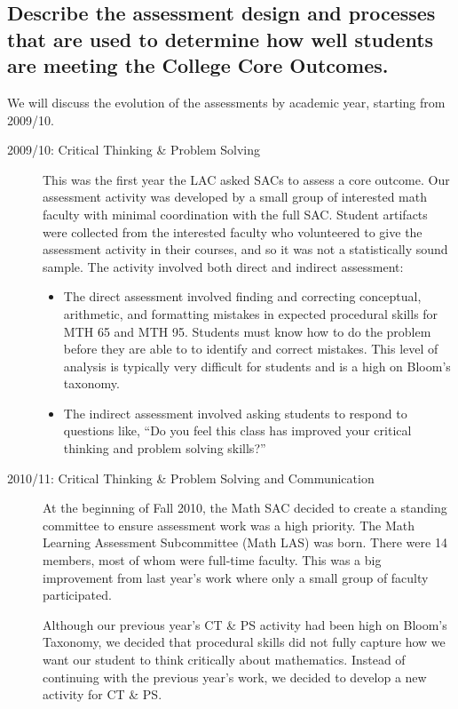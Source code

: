 \subsection[Core outcome assessment design and process]{Describe the assessment design and processes that are used to
determine how well students are meeting the College Core Outcomes.}
We will discuss the evolution of the assessments by academic year, starting
from 2009/10.
\begin{description}
	\item [2009/10: Critical Thinking  \& Problem Solving]

	This was the first year the LAC asked SACs to assess a core outcome. Our
	assessment activity was developed by a small group of interested math faculty
	with minimal coordination with the full SAC. Student artifacts were collected
	from the interested faculty who volunteered to give the assessment activity in
	their courses, and so it was not a statistically sound sample.  The activity
	involved both direct and indirect assessment:
	\begin{itemize}
		\item The direct assessment involved finding and correcting conceptual,
		arithmetic, and formatting mistakes in expected procedural skills for MTH 65
		and MTH 95. Students must know how to do the problem before they are able to
		to identify and correct mistakes. This level of analysis is typically very
		difficult for students and is a high on Bloom's taxonomy.
		\item The indirect assessment involved asking students to respond to questions
		like, ``Do you feel this class has improved your critical thinking and problem
		solving skills?''
	\end{itemize}

	\item[2010/11:  Critical Thinking \& Problem Solving and Communication]

	At the beginning of Fall 2010, the Math SAC decided to create a standing
	committee to ensure assessment work was a high priority. The Math Learning
	Assessment Subcommittee (Math LAS) was born.  There were 14 members, most of
	whom were full-time faculty. This was a big improvement from last year's work
	where only a small group of faculty participated.

	Although our previous year's CT \& PS activity had been high on Bloom's
	Taxonomy, we decided that procedural skills did not fully capture how we want
	our student to think critically about mathematics.  Instead of continuing with
	the previous year's work, we decided to develop a new activity for CT \& PS.


\end{description}
